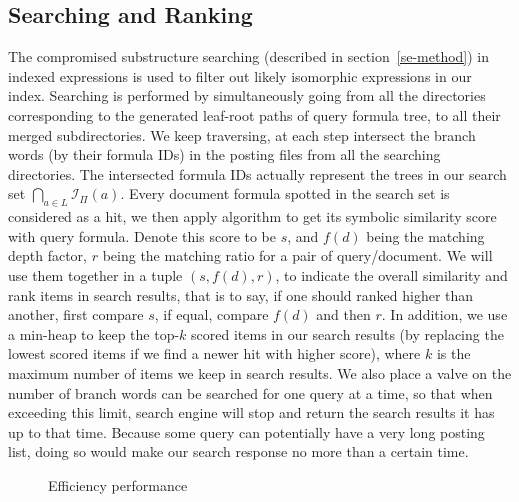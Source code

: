 \documentclass{acm_proc_article-sp}
\begin{document}
\subsection{Searching and Ranking}
\label{se-and-rank}
The compromised substructure searching (described in section~\ref{se-method}) in indexed expressions is used to filter out likely isomorphic expressions in our index.
Searching is performed by simultaneously going from all the directories corresponding to the generated leaf-root paths of query formula tree,
to all their merged subdirectories. 
We keep traversing, at each step intersect  the branch words (by their formula IDs) in the posting files from all the searching directories. 
The intersected formula IDs actually represent the trees in our search set $\bigcap_{a \in L} \mathcal{I}_{\Pi}(a)$.
Every document formula spotted in the search set is considered as a hit, we then apply  algorithm to get its symbolic similarity score with query formula. 
Denote this score to be $s$, and $f(d)$ being the matching depth factor, $r$ being the matching ratio for a pair of query/document. 
We will use them together in a tuple $(s, f(d), r)$, to indicate the overall similarity and rank items in search results,
that is to say, if one should ranked higher than another, first compare $s$, if equal, compare $f(d)$ and then $r$.
In addition, we use a min-heap to keep the top-$k$ scored items in our search results (by replacing the lowest scored items if we find a newer hit with higher score), where $k$ is the maximum number of items we keep in search results.
We also place a valve on the number of branch words can be searched for one query at a time,
so that when exceeding this limit, search engine will stop and return the search results it has up to that time. Because some query can potentially have a very long posting list, doing so would make our search response no more than a certain time.

\begin{figure}
\begin{center}
\end{center}
\caption{Efficiency performance}\label{effiperf}
\end{figure}
\end{document}
